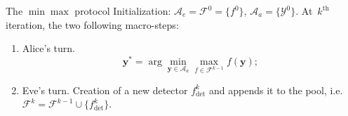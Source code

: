 \documentclass[10pt,aspectratio=169]{beamer}
\newcommand{\fdet}{f_{\mathrm{det}}}
\newcommand{\fset}{\mathcal{F}}
\DeclareMathOperator*{\argmin}{arg\,min} %
\begin{document}
    

    


\begin{frame}{The $\min\max$ protocol}
    Initialization: $\mathcal{A}_e = \fset^{0} = \{f^0\}$,  $\mathcal{A}_a = \{\mathcal{Y}^0\}$.
    \pause
    At~$k^{\mathrm{th}}$ iteration, the two following macro-steps: 
    \begin{enumerate}
        \item \alert<2>{Alice's turn.} 
            \begin{equation}
                \mathbf{y}^\ast = \arg \min_{\mathbf{y} \in \mathcal{A}_a} \max_{f \in \fset^{k-1}} f(\mathbf{y});
                \label{eq:stepone}	
            \end{equation}
            \pause
        \item Eve's turn. Creation of a new detector $\fdet^k$ and appends it to the pool, i.e. $\fset^k = \fset^{k-1} \cup \{\fdet^k\}.$
    \end{enumerate}
\end{frame}

\end{document}
